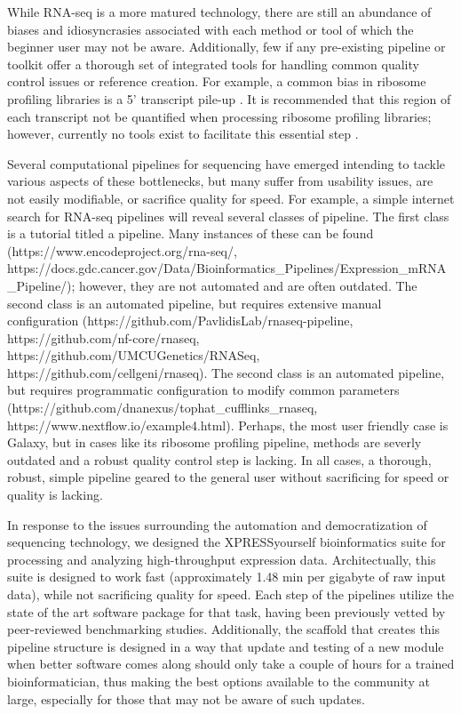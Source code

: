 \documentclass[11pt, a4paper, oneside]{article}
\begin{document}
While RNA-seq is a more matured technology, there are still an abundance of biases and idiosyncrasies associated with each method or tool of which the beginner user may not be aware. Additionally, few if any pre-existing pipeline or toolkit offer a thorough set of integrated tools for handling common quality control issues or reference creation. For example, a common bias in ribosome profiling libraries is a 5' transcript pile-up \cite{gerashchenko_nar, artieri_gr, hussman_plosg}. It is recommended that this region of each transcript not be quantified when processing ribosome profiling libraries; however, currently no tools exist to facilitate this essential step \cite{ingolia_meth, weinberg_reports}.

Several computational pipelines for sequencing have emerged intending to tackle various aspects of these bottlenecks, but many suffer from usability issues, are not easily modifiable, or sacrifice quality for speed. For example, a simple internet search for RNA-seq pipelines will reveal several classes of pipeline. The first class is a tutorial titled a pipeline. Many instances of these can be found (https://www.encodeproject.org/rna-seq/, https://docs.gdc.cancer.gov/Data/Bioinformatics\_Pipelines/Expression\_mRNA\_Pipeline/); however, they are not automated and are often outdated. The second class is an automated pipeline, but requires extensive manual configuration (https://github.com/PavlidisLab/rnaseq-pipeline, https://github.com/nf-core/rnaseq, https://github.com/UMCUGenetics/RNASeq, https://github.com/cellgeni/rnaseq). The second class is an automated pipeline, but requires programmatic configuration to modify common parameters (https://github.com/dnanexus/tophat\_cufflinks\_rnaseq, https://www.nextflow.io/example4.html). Perhaps, the most user friendly case is Galaxy, but in cases like its ribosome profiling pipeline, methods are severly outdated and a robust quality control step is lacking. In all cases, a thorough, robust, simple pipeline geared to the general user without sacrificing for speed or quality is lacking.

In response to the issues surrounding the automation and democratization of sequencing technology, we designed the XPRESSyourself bioinformatics suite for processing and analyzing high-throughput expression data. Architectually, this suite is designed to work fast (approximately 1.48 min per gigabyte of raw input data), while not sacrificing quality for speed. Each step of the pipelines utilize the state of the art software package for that task, having been previously vetted by peer-reviewed benchmarking studies. Additionally, the scaffold that creates this pipeline structure is designed in a way that update and testing of a new module when better software comes along should only take a couple of hours for a trained bioinformatician, thus making the best options available to the community at large, especially for those that may not be aware of such updates.
\end{document}
